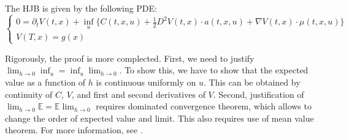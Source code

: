 \documentclass[11pt]{book}
\begin{document}
The HJB is given by the following PDE:
\begin{equation}
    \begin{cases}
        0=\partial_t V(t,x)+\inf_{u}\Big\{C(t,x,u) +
         \frac12 D^2V(t,x) \cdot a(t,x,u) + \nabla V(t,x)\cdot \mu(t,x,u)\Big\}\\
         V(T,x)=g(x)
    \end{cases}
\end{equation}
\begin{rem}
    Rigorously, the proof is more complected. First, we need to justify $\lim_{h\to0}\inf_{u}=\inf_{u}\lim_{h\to0}$. To show this, we have to show that the expected value as a function of $h$ is continuous uniformly on $u$. This can be obtained by continuity of $C$, $V$, and first and second derivatives of $V$. Second, justification of $\lim_{h\to0}\mathbb{E}=\mathbb{E}\lim_{h\to0}$ requires dominated convergence theorem, which allows to change the order of expected value and limit. This also requires use of mean value theorem. For more information, see \cite{Touzi12}.
\end{rem}
\end{document}

